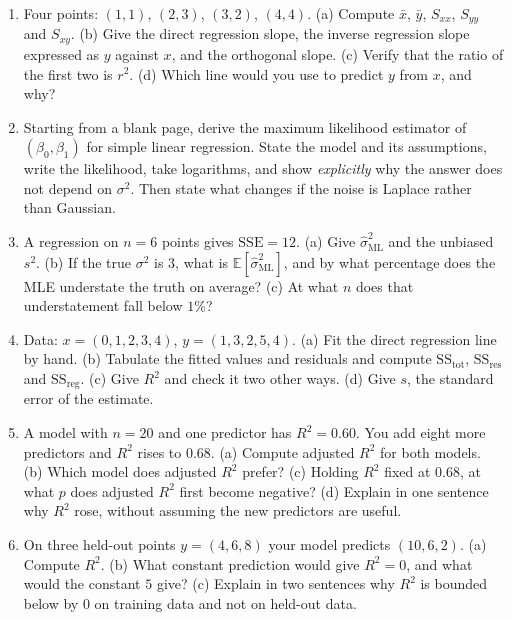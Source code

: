 \documentclass[11pt]{article}
\begin{document}
\begin{enumerate}[leftmargin=*]
  \item\label{q:three} Four points: $(1,1)$, $(2,3)$, $(3,2)$, $(4,4)$.
    (a) Compute $\bar x$, $\bar y$, $S_{xx}$, $S_{yy}$ and $S_{xy}$.
    (b) Give the direct regression slope, the inverse regression slope
    expressed as $y$ against $x$, and the orthogonal slope. (c) Verify that
    the ratio of the first two is $r^2$. (d) Which line would you use to
    predict $y$ from $x$, and why?

  \item\label{q:derive} Starting from a blank page, derive the maximum
    likelihood estimator of $(\beta_0, \beta_1)$ for simple linear regression.
    State the model and its assumptions, write the likelihood, take
    logarithms, and show \emph{explicitly} why the answer does not depend on
    $\sigma^2$. Then state what changes if the noise is Laplace rather than
    Gaussian.

  \item\label{q:sigma} A regression on $n = 6$ points gives
    $\mathrm{SSE} = 12$. (a) Give $\hat\sigma^2_{\mathrm{ML}}$ and the
    unbiased $s^2$. (b) If the true $\sigma^2$ is $3$, what is
    $\mathbb{E}[\hat\sigma^2_{\mathrm{ML}}]$, and by what percentage does the
    MLE understate the truth on average? (c) At what $n$ does that
    understatement fall below $1\%$?

  \item\label{q:r2hand} Data: $x = (0,1,2,3,4)$, $y = (1,3,2,5,4)$.
    (a) Fit the direct regression line by hand. (b) Tabulate the fitted values
    and residuals and compute $\mathrm{SS_{tot}}$, $\mathrm{SS_{res}}$ and
    $\mathrm{SS_{reg}}$. (c) Give $R^2$ and check it two other ways.
    (d) Give $s$, the standard error of the estimate.

  \item\label{q:adj} A model with $n = 20$ and one predictor has $R^2 = 0.60$.
    You add eight more predictors and $R^2$ rises to $0.68$.
    (a) Compute adjusted $R^2$ for both models. (b) Which model does adjusted
    $R^2$ prefer? (c) Holding $R^2$ fixed at $0.68$, at what $p$ does adjusted
    $R^2$ first become negative? (d) Explain in one sentence why $R^2$ rose,
    without assuming the new predictors are useful.

  \item\label{q:neg} On three held-out points $y = (4, 6, 8)$ your model
    predicts $(10, 6, 2)$. (a) Compute $R^2$. (b) What constant prediction
    would give $R^2 = 0$, and what would the constant $5$ give? (c) Explain in
    two sentences why $R^2$ is bounded below by $0$ on training data and not on
    held-out data.


\end{enumerate}
\end{document}
